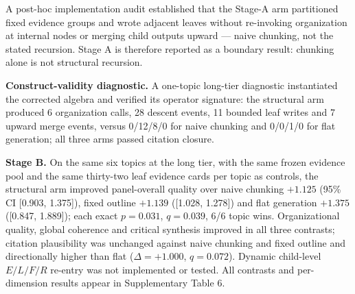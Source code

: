 \documentclass[11pt,a4paper]{article}
\begin{document}
A post-hoc implementation audit established that the Stage-A arm partitioned fixed evidence groups and wrote adjacent leaves without re-invoking organization at internal nodes or merging child outputs upward --- naive chunking, not the stated recursion. Stage A is therefore reported as a boundary result: chunking alone is not structural recursion.

\textbf{Construct-validity diagnostic.} A one-topic long-tier diagnostic instantiated the corrected algebra and verified its operator signature: the structural arm produced 6 organization calls, 28 descent events, 11 bounded leaf writes and 7 upward merge events, versus 0/12/8/0 for naive chunking and 0/0/1/0 for flat generation; all three arms passed citation closure.

\textbf{Stage B.} On the same six topics at the long tier, with the same frozen evidence pool and the same thirty-two leaf evidence cards per topic as controls, the structural arm improved panel-overall quality over naive chunking $+1.125$ (95\% CI [0.903, 1.375]), fixed outline $+1.139$ ([1.028, 1.278]) and flat generation $+1.375$ ([0.847, 1.889]); each exact $p=0.031$, $q=0.039$, 6/6 topic wins. Organizational quality, global coherence and critical synthesis improved in all three contrasts; citation plausibility was unchanged against naive chunking and fixed outline and directionally higher than flat ($\Delta=+1.000$, $q=0.072$). Dynamic child-level $E/L/F/R$ re-entry was not implemented or tested. All contrasts and per-dimension results appear in Supplementary Table 6.
\end{document}
